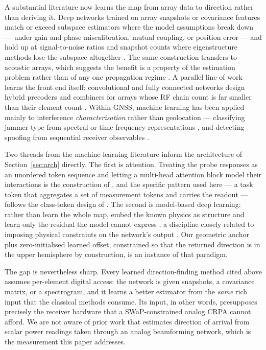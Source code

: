 \documentclass[journal]{IEEEtran}
\begin{document}
A substantial literature now learns the map from array data to direction rather
than deriving it. Deep networks trained on array snapshots or covariance
features match or exceed subspace estimators where the model assumptions break
down --- under gain and phase miscalibration, mutual coupling, or position
error \cite{liu2018doa} --- and hold up at signal-to-noise ratios and snapshot
counts where eigenstructure methods lose the subspace altogether
\cite{papageorgiou2021}. The same construction transfers to acoustic arrays,
which suggests the benefit is a property of the estimation problem rather than
of any one propagation regime \cite{ozanich2020}. A parallel line of work
learns the front end itself: convolutional and fully connected networks design
hybrid precoders and combiners for arrays whose RF chain count is far smaller
than their element count \cite{elbir2019, huang2019}. Within GNSS, machine
learning has been applied mainly to interference \emph{characterisation} rather
than geolocation --- classifying jammer type from spectral or time-frequency
representations \cite{ferre2019, brieger2022}, and detecting spoofing from
sequential receiver observables \cite{wen2023}.

Two threads from the machine-learning literature inform the architecture of
Section~\ref{sec:arch} directly. The first is attention. Treating the probe
responses as an unordered token sequence and letting a multi-head attention
block model their interactions is the construction of \cite{vaswani2017}, and
the specific pattern used here --- a task token that aggregates a set of
measurement tokens and carries the readout --- follows the class-token design
of \cite{dosovitskiy2021}. The second is model-based deep learning: rather than
learn the whole map, embed the known physics as structure and learn only the
residual the model cannot express \cite{shlezinger2023}, a discipline closely
related to imposing physical constraints on the network's output
\cite{raissi2019}. Our geometric anchor plus zero-initialised learned offset,
constrained so that the returned direction is in the upper hemisphere by
construction, is an instance of that paradigm.

The gap is nevertheless sharp. Every learned direction-finding method cited
above assumes per-element digital access: the network is given snapshots, a
covariance matrix, or a spectrogram, and it learns a better estimator from the
\emph{same} rich input that the classical methods consume. Its input, in other
words, presupposes precisely the receiver hardware that a SWaP-constrained
analog CRPA cannot afford. We are not aware of prior work that estimates
direction of arrival from scalar power readings taken through an analog
beamforming network, which is the measurement this paper addresses.
\end{document}
